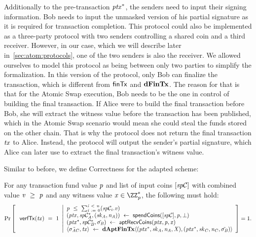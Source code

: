\begin{definition}
\begin{asparaitem}
        Additionally to the pre-transaction $\mathit{ptx}^*$, the senders need to input their signing information.
        Bob needs to input the unmasked version of his partial signature as it is required for transaction completion.
        This protocol could also be implemented as a three-party protocol with two senders controlling a shared coin and a third receiver.
        However, in our case, which we will describe later in~\cref{sec:atom:protocols}, one of the two senders is also the receiver.
        We allowed ourselves to model this protocol as being between only two parties to simplify the formalization.
        In this version of the protocol, only Bob can finalize the transaction, which is different from $\mathsf{finTx}$ and $\mathbf{dFinTx}$.
        The reason for that is that for the Atomic Swap execution, Bob needs to be the one in control of building the final transaction.
        If Alice were to build the final transaction before Bob, she will extract the witness value before the transaction has been published, which in the Atomic Swap scenario would mean she could steal the funds stored on the other chain.
        That is why the protocol does not return the final transaction $\mathit{tx}$ to Alice.
        Instead, the protocol will output the sender's partial signature, which Alice can later use to extract the final transaction's witness value.
    \end{asparaitem}
\end{definition}

Similar to before, we define Correctness for the adapted scheme:

\begin{definition}
    \label{def:atom:apt-tx-scheme-correctness}
    For any transaction fund value $\mathit{p}$ and list of input coins $[\mathit{sp}\mathcal{C}]$ with combined value $\mathit{v} ~\geq~ \mathit{p}$ and any witness value $\varX \opIn \cnstIntegersPrimeWithoutZero{\varPrime}$, the following must hold:
    \[
        \Pr\left[
        \begin{array}{c}
            \: \mathsf{verfTx}(\mathit{tx}) ~=~ 1
        \end{array}
        \middle\vert
        \begin{array}{l}
            \mathit{p} ~\leq~ \sum_{\mathit{i} ~:=~ 0}^{\mathit{i} ~<~ \mathit{n}}(\mathit{sp}\mathcal{C}_{i}.\mathit{v}) \\
            (\mathit{ptx}, \mathit{sp}\mathcal{C}_{\mathit{A}}^*, (\mathit{sk}_{\mathit{A}}, \mathit{\mathit{n}_{\mathit{A}}})) ~\leftarrow~ \mathsf{spendCoins}([\mathit{sp}\mathcal{C}],\mathit{p},\bot) \\
            (\mathit{ptx}^*, \mathit{sp}\mathcal{C}_{\mathit{B}}^*, \tilde{\sigma_{\mathit{B}}}) ~\leftarrow~ \mathsf{aptRecvCoins}(\mathit{ptx},\mathit{p},\mathit{x}) \\
            \langle \tilde{\sigma_{\mathit{A}\mathit{C}}}, \mathit{tx} \rangle ~\leftarrow~ \mathbf{dAptFinTx} \langle (\mathit{ptx}^*,\mathit{sk}_{\mathit{A}},\mathit{\mathit{n}_{\mathit{A}}},\mathit{X}), (\mathit{ptx}^*,\mathit{sk}_{\mathit{C}},\mathit{\mathit{n}_{\mathit{C}}},\tilde{\sigma_{\mathit{B}}}) \rangle
        \end{array}
        \right]=1.
    \]
\end{definition}
